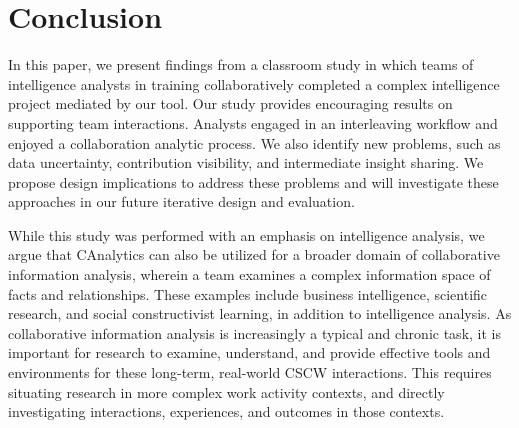 \section{Conclusion}

In this paper, we present findings from a classroom study in which teams of intelligence analysts in training collaboratively completed a complex intelligence project mediated by our tool. Our study provides encouraging results on supporting team interactions. Analysts engaged in an interleaving workflow and enjoyed a collaboration analytic process. We also identify new problems, such as data uncertainty, contribution visibility, and intermediate insight sharing. We propose design implications to address these problems and will investigate these approaches in our future iterative design and evaluation.

While this study was performed with an emphasis on intelligence analysis, we argue that CAnalytics can also be utilized for a broader domain of collaborative information analysis, wherein a team examines a complex information space of facts and relationships. These examples include business intelligence, scientific research, and social constructivist learning, in addition to intelligence analysis. As collaborative information analysis is increasingly a typical and chronic task, it is important for research to examine, understand, and provide effective tools and environments for these long-term, real-world CSCW interactions. This requires situating research in more complex work activity contexts, and directly investigating interactions, experiences, and outcomes in those contexts.   




%
%
%
%
%
